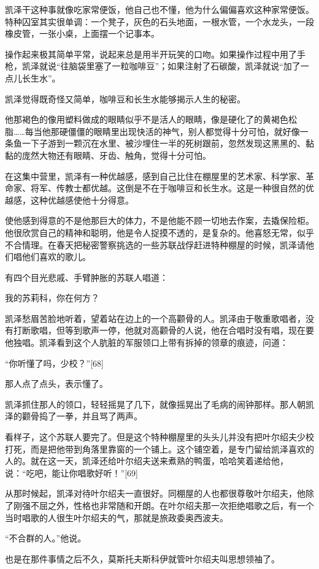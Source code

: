 凯泽干这种事就像吃家常便饭，他自己也不懂，他为什么偏偏喜欢这种家常便饭。特种囚室其实很单调：一个凳子，灰色的石头地面，一根水管，一个水龙头，一段橡皮管，一张小桌，上面摆一个记事本。

操作起来极其简单平常，说起来总是用半开玩笑的口吻。如果操作过程中用了手枪，凯泽就说“往脑袋里塞了一粒咖啡豆”；如果注射了石碳酸，凯泽就说“加了一点儿长生水”。

凯泽觉得既奇怪又简单，咖啡豆和长生水能够揭示人生的秘密。

他那褐色的像用塑料做成的眼睛似乎不是活人的眼睛，像是硬化了的黄褐色松脂……每当他那硬僵僵的眼睛里出现快活的神气，别人都觉得十分可怕，就好像一条鱼一下子游到一颗沉在水里、被沙埋住一半的死树跟前，忽然发现这黑黑的、黏黏的庞然大物还有眼睛、牙齿、触角，觉得十分可怕。

在这集中营里，凯泽有一种优越感，感到自己比住在棚屋里的艺术家、科学家、革命家、将军、传教士都优越。这倒是不在于咖啡豆和长生水。这是一种很自然的优越感，这种优越感使他十分得意。

使他感到得意的不是他那巨大的体力，不是他能不顾一切地去作案，去撬保险柜。他很欣赏自己的精神和聪明，他是令人捉摸不透的，是复杂的。他喜怒无常，似乎不合情理。在春天把秘密警察挑选的一些苏联战俘赶进特种棚屋的时候，凯泽请他们唱他们喜欢的歌儿。

有四个目光悲戚、手臂肿胀的苏联人唱道：

我的苏莉科，你在何方？

凯泽愁眉苦脸地听着，望着站在边上的一个高颧骨的人。凯泽由于敬重歌唱者，没有打断歌唱，但等到歌声一停，他就对高颧骨的人说，他在合唱时没有唱，现在要他独唱。凯泽看到这个人肮脏的军服领口上带有拆掉的领章的痕迹，问道：

“你听懂了吗，少校？”[68]

那人点了点头，表示懂了。

凯泽抓住那人的领口，轻轻摇晃了几下，就像摇晃出了毛病的闹钟那样。那人朝凯泽的颧骨捣了一拳，并且骂了两声。

看样子，这个苏联人要完了。但是这个特种棚屋里的头头儿并没有把叶尔绍夫少校打死，而是把他带到角落里靠窗的一个铺上。这个铺空着，是专门留给凯泽喜欢的人的。就在这一天，凯泽还给叶尔绍夫送来煮熟的鸭蛋，哈哈笑着递给他，说：“吃吧，能让你唱歌好听！”[69]

从那时候起，凯泽对待叶尔绍夫一直很好。同棚屋的人也都很尊敬叶尔绍夫，他除了刚强不屈之外，性格也非常随和开朗。在叶尔绍夫那一次拒绝唱歌之后，有一个当时唱歌的人很生叶尔绍夫的气，那就是旅政委奥西波夫。

“不合群的人。”他说。

也是在那件事情之后不久，莫斯托夫斯科伊就管叶尔绍夫叫思想领袖了。

